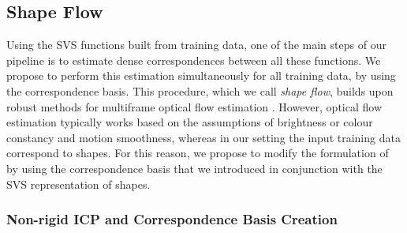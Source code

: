 






\subsection{Shape Flow}
\label{sec:shapeflow}


Using the SVS functions built from training data, one of the main steps of our pipeline is to estimate dense correspondences between all these functions. We propose to perform this estimation simultaneously for all training data, by using the correspondence basis. This procedure, which we call \emph{shape flow}, builds upon robust methods for multiframe optical flow estimation \cite{Garg:2013hu}. However, optical flow estimation typically works based on the assumptions of brightness or colour constancy and motion smoothness, whereas in our setting the input training data correspond to shapes. For this reason, we propose to modify the formulation of \cite{Garg:2013hu} by using the correspondence basis that we introduced in conjunction with the SVS representation of shapes.


%



\subsubsection{Non-rigid ICP and Correspondence Basis Creation} \label{sec:trabasis}



